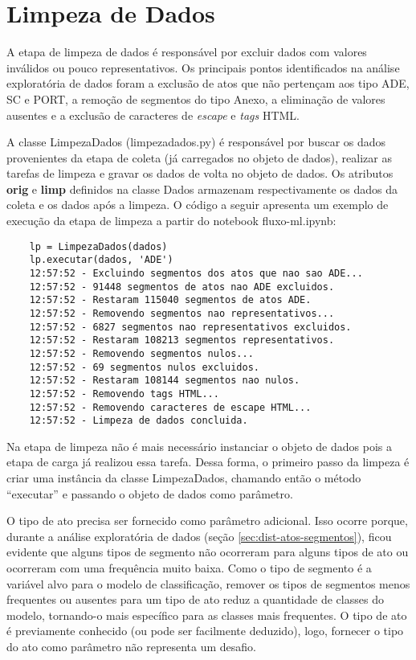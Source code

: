 \section{Limpeza de Dados}

A etapa de limpeza de dados é responsável por excluir dados com valores inválidos ou pouco representativos. Os principais pontos identificados na análise exploratória de dados foram a exclusão de atos que não pertençam aos tipo ADE, SC e PORT, a remoção de segmentos do tipo Anexo, a eliminação de valores ausentes e a exclusão de caracteres de \textit{escape} e \textit{tags} HTML.

A classe LimpezaDados (limpeza\textunderscore dados.py) é responsável por buscar os dados provenientes da etapa de coleta (já carregados no objeto de dados), realizar as tarefas de limpeza e gravar os dados de volta no objeto de dados. Os atributos \textbf{orig} e \textbf{limp} definidos na classe Dados armazenam  respectivamente os dados da coleta e os dados após a limpeza. O código a seguir apresenta um exemplo de execução da etapa de limpeza a partir do notebook fluxo-ml.ipynb:

\begin{lstlisting}
	lp = LimpezaDados(dados)
	lp.executar(dados, 'ADE')
	12:57:52 - Excluindo segmentos dos atos que nao sao ADE...
	12:57:52 - 91448 segmentos de atos nao ADE excluidos.
	12:57:52 - Restaram 115040 segmentos de atos ADE.
	12:57:52 - Removendo segmentos nao representativos...
	12:57:52 - 6827 segmentos nao representativos excluidos.
	12:57:52 - Restaram 108213 segmentos representativos.
	12:57:52 - Removendo segmentos nulos...
	12:57:52 - 69 segmentos nulos excluidos.
	12:57:52 - Restaram 108144 segmentos nao nulos.
	12:57:52 - Removendo tags HTML...
	12:57:52 - Removendo caracteres de escape HTML...
	12:57:52 - Limpeza de dados concluida.
\end{lstlisting}

Na etapa de limpeza não é mais necessário instanciar o objeto de dados pois a etapa de carga já realizou essa tarefa. Dessa forma, o primeiro passo da limpeza é criar uma instância da classe LimpezaDados, chamando então o método ``executar'' e passando o objeto de dados como parâmetro. 

O tipo de ato precisa ser fornecido como parâmetro adicional. Isso ocorre porque, durante a análise exploratória de dados (seção \ref{sec:dist-atos-segmentos}), ficou evidente que alguns tipos de segmento não ocorreram para alguns tipos de ato ou ocorreram com uma frequência muito baixa. Como o tipo de segmento é a variável alvo para o modelo de classificação, remover os tipos de segmentos menos frequentes ou ausentes para um tipo de ato reduz a quantidade de classes do modelo, tornando-o mais específico para as classes mais frequentes. O tipo de ato é previamente conhecido (ou pode ser facilmente deduzido), logo, fornecer o tipo do ato como parâmetro não representa um desafio. 

